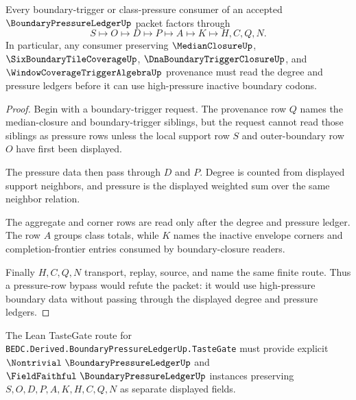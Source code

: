 \begin{theorem}
\label{thm:boundary-pressure-ledger-trigger-handoff}
Every boundary-trigger or class-pressure consumer of an accepted $\BoundaryPressureLedgerUp$ packet factors through
$$
S \longmapsto O \longmapsto D \longmapsto P \longmapsto A \longmapsto K \longmapsto H,C,Q,N .
$$
In particular, any consumer preserving $\MedianClosureUp$, $\SixBoundaryTileCoverageUp$, $\DnaBoundaryTriggerClosureUp$, and $\WindowCoverageTriggerAlgebraUp$ provenance must read the degree and pressure ledgers before it can use high-pressure inactive boundary codons.
\end{theorem}
\begin{proof}
Begin with a boundary-trigger request. The provenance row $Q$ names the median-closure and boundary-trigger siblings, but the request cannot read those siblings as pressure rows unless the local support row $S$ and outer-boundary row $O$ have first been displayed.

The pressure data then pass through $D$ and $P$. Degree is counted from displayed support neighbors, and pressure is the displayed weighted sum over the same neighbor relation.

The aggregate and corner rows are read only after the degree and pressure ledger. The row $A$ groups class totals, while $K$ names the inactive envelope corners and completion-frontier entries consumed by boundary-closure readers.

Finally $H,C,Q,N$ transport, replay, source, and name the same finite route. Thus a pressure-row bypass would refute the packet: it would use high-pressure boundary data without passing through the displayed degree and pressure ledgers.
\end{proof}



The Lean TasteGate route for \texttt{BEDC.Derived.BoundaryPressureLedgerUp.TasteGate} must provide explicit $\Nontrivial\ \BoundaryPressureLedgerUp$ and $\FieldFaithful\ \BoundaryPressureLedgerUp$ instances preserving $S,O,D,P,A,K,H,C,Q,N$ as separate displayed fields.

